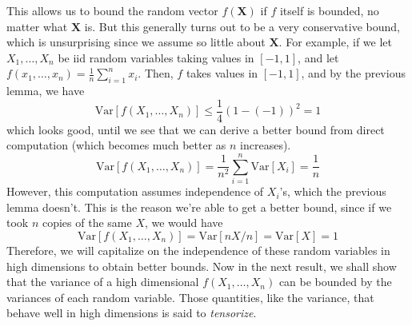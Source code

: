 \documentclass{article}
\begin{document}
  This allows us to bound the random vector $f(\mathbf{X})$ if $f$ itself is bounded, no matter what $\mathbf{X}$ is. But this generally turns out to be a very conservative bound, which is unsurprising since we assume so little about $\mathbf{X}$. For example, if we let $X_1, \ldots, X_n$ be iid random variables taking values in $[-1, 1]$, and let $f(x_1, \ldots, x_n) = \frac{1}{n} \sum_{i=1}^n x_i$. Then, $f$ takes values in $[-1, 1]$, and by the previous lemma, we have
  \[\mathrm{Var}[f(X_1, \ldots, X_n)] \leq \frac{1}{4} (1 - (-1))^2 = 1\]
  which looks good, until we see that we can derive a better bound from direct computation (which becomes much better as $n$ increases). 
  \[\mathrm{Var}[f(X_1, \ldots, X_n)] = \frac{1}{n^2} \sum_{i=1}^n \mathrm{Var}[X_i] = \frac{1}{n}\]
  However, this computation assumes independence of $X_i$'s, which the previous lemma doesn't. This is the reason we're able to get a better bound, since if we took $n$ copies of the same $X$, we would have 
  \[\mathrm{Var}[f(X_1, \ldots, X_n)] = \mathrm{Var}[n X / n] = \mathrm{Var}[X] = 1\]
  Therefore, we will capitalize on the independence of these random variables in high dimensions to obtain better bounds. Now in the next result, we shall show that the variance of a high dimensional $f(X_1, \ldots, X_n)$ can be bounded by the variances of each random variable. Those quantities, like the variance, that behave well in high dimensions is said to \textit{tensorize}. 
\end{document}
